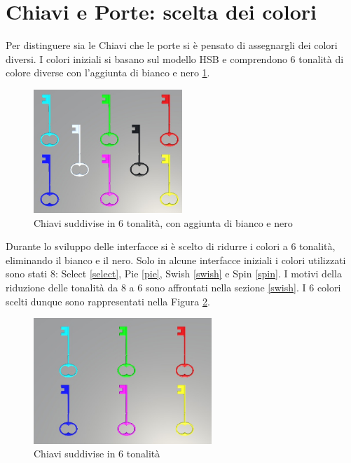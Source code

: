 \documentclass[target=bach,aauheader=]{thud}
\begin{document}
\section{Chiavi e Porte: scelta dei colori}
\label{keys}
Per distinguere sia le Chiavi che le porte si è pensato di assegnargli dei colori diversi.
I colori iniziali si basano sul modello HSB e comprendono 6 tonalità di colore diverse con l'aggiunta di bianco e nero \ref{fig:keys2}.

\begin{figure}[h]
    \centering
    \includegraphics[width=0.50\textwidth]{keys2}
    \caption{Chiavi suddivise in 6 tonalità, con aggiunta di bianco e nero}
    \label{fig:keys2}
\end{figure}
Durante lo sviluppo delle interfacce si è scelto di ridurre i colori a 6 tonalità, eliminando il bianco e il nero.
Solo in alcune interfacce iniziali i colori utilizzati sono stati 8: Select \ref{select}, Pie \ref{pie}, Swish \ref{swish} e Spin \ref{spin}. %
I motivi della riduzione delle tonalità da 8 a 6 sono affrontati nella sezione \ref{swish}. %
I 6 colori scelti dunque sono rappresentati nella Figura \ref{fig:keys}. \\

\begin{figure}[h]
    \centering
    \includegraphics[width=0.60\textwidth]{keys}
    \caption{Chiavi suddivise in 6 tonalità}
    \label{fig:keys}
\end{figure}
\end{document}
